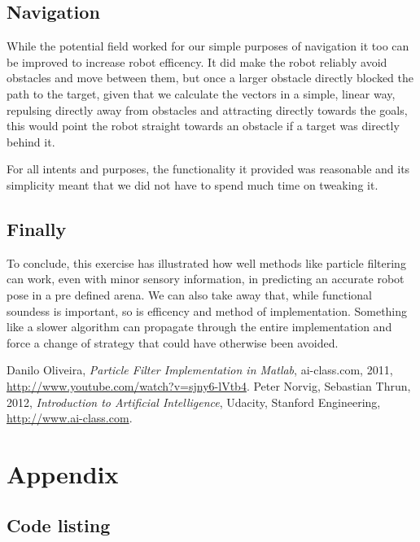 \documentclass[paper=a4, fontsize=12pt]{scrartcl}	%
\numberwithin{equation}{section}		%
\numberwithin{figure}{section}			%
\numberwithin{table}{section}				%
\begin{document}
\subsection{Navigation}
While the potential field worked for our simple purposes of navigation it too can be improved to increase robot efficency. It did make the robot reliably avoid obstacles and move between them, but once a larger obstacle directly blocked the path to the target, given that we calculate the vectors in a simple, linear way, repulsing directly away from obstacles and attracting directly towards the goals, this would point the robot straight towards an obstacle if a target was directly behind it.

For all intents and purposes, the functionality it provided was reasonable and its simplicity meant that we did not have to spend much time on tweaking it.
\subsection{Finally}
To conclude, this exercise has illustrated how well methods like particle filtering can work, even with minor sensory information, in predicting an accurate robot pose in a pre defined arena. We can also take away that, while functional soundess is important, so is efficency and method of implementation. Something like a slower algorithm can propagate through the entire implementation and force a change of strategy that could have otherwise been avoided.

\begin{thebibliography}{9}
  Danilo Oliveira,
  \emph{Particle Filter Implementation in Matlab},
  ai-class.com,
  2011,
  \url{http://www.youtube.com/watch?v=sjny6-lVtb4}.
  Peter Norvig, Sebastian Thrun,
  2012,
  \emph{Introduction to Artificial Intelligence},
  Udacity, Stanford Engineering,
  \url{http://www.ai-class.com}.
\end{thebibliography}
\section{Appendix}
\subsection{Code listing}

\end{document}
